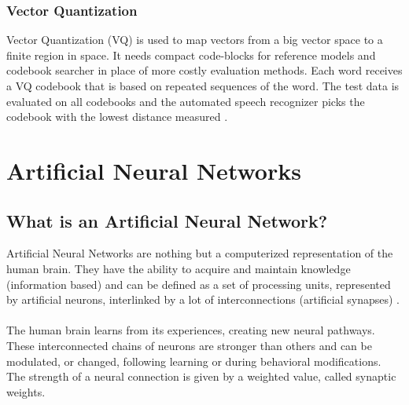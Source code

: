 \subsubsection{Vector Quantization}

Vector Quantization (VQ) is used to map vectors from a big vector space to a finite region in space. 
It needs compact code-blocks for reference models and codebook searcher in place of more costly evaluation methods. 
Each word receives a VQ codebook that is based on repeated sequences of the word.
The test data is evaluated on all codebooks and the automated speech recognizer picks the codebook with the lowest distance measured
\cite[p.~20-21]{togneri1990speech}.


\section{Artificial Neural Networks}\label{sec:ANN}
\subsection{What is an Artificial Neural Network?}
Artificial Neural Networks are nothing but a computerized representation of the human brain. 
They have the ability to acquire and maintain knowledge (information based) and can be defined as a set of processing units, represented by artificial neurons,
interlinked by a lot of interconnections
(artificial synapses) \cite[p.~5]{Silva2016}.\\\\
The human brain learns from its experiences, creating new neural pathways. These interconnected chains of neurons are stronger than others and can be modulated, or changed,
following learning or during behavioral modifications.
The strength of a neural connection is given by a weighted value, called synaptic weights.

